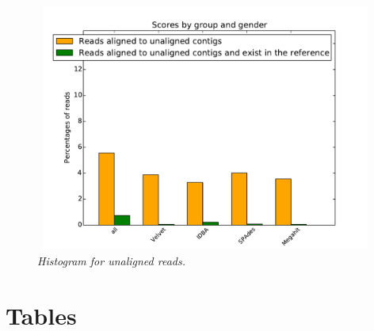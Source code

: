 \begin{figure} [h] 
\begin{center}  
 
\includegraphics[height=3.2in,width=4.5in]{unaliged-hist.pdf}  
\caption{\small \sl Histogram for unaligned reads.\label{fig:unaliged-hist}}  
\end{center}  
\end{figure} 

\section*{Tables}
% 
%
%






